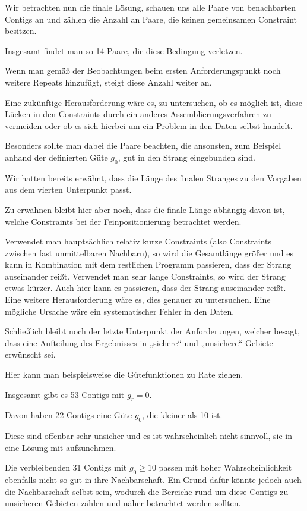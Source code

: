 Wir betrachten nun die finale Lösung, schauen uns alle Paare von benachbarten Contigs an und zählen die Anzahl an Paare, die keinen gemeinsamen Constraint besitzen.

Insgesamt findet man so 14 Paare, die diese Bedingung verletzen.

Wenn man gemäß der Beobachtungen beim ersten Anforderungspunkt noch weitere Repeats hinzufügt, steigt diese Anzahl weiter an.

Eine zukünftige Herausforderung wäre es, zu untersuchen, ob es möglich ist, diese Lücken in den Constraints durch ein anderes Assemblierungsverfahren zu vermeiden oder ob es sich hierbei um ein Problem in den Daten selbst handelt.

Besonders sollte man dabei die Paare beachten, die ansonsten, zum Beispiel anhand der definierten Güte $g_0$, gut in den Strang eingebunden sind.


Wir hatten bereits erwähnt, dass die Länge des finalen Stranges zu den Vorgaben aus dem vierten Unterpunkt passt.

Zu erwähnen bleibt hier aber noch, dass die finale Länge abhängig davon ist, welche Constraints bei der Feinpositionierung betrachtet werden.


Verwendet man hauptsächlich relativ kurze Constraints (also Constraints zwischen fast unmittelbaren Nachbarn), so wird die Gesamtlänge größer und es kann in Kombination mit dem restlichen Programm passieren, dass der Strang auseinander reißt. Verwendet man sehr lange Constraints, so wird der Strang etwas kürzer. Auch hier kann es passieren, dass der Strang auseinander reißt. Eine weitere Herausforderung wäre es, dies genauer zu untersuchen. Eine mögliche Ursache wäre ein systematischer Fehler in den Daten.

Schließlich bleibt noch der letzte Unterpunkt der Anforderungen, welcher besagt, dass eine Aufteilung des Ergebnisses in „sichere“ und „unsichere“ Gebiete erwünscht sei.

Hier kann man beispielsweise die Gütefunktionen zu Rate ziehen.


Insgesamt gibt es 53 Contigs mit $g_r = 0$.

Davon haben 22 Contigs eine Güte $g_0$, die kleiner als 10 ist.

Diese sind offenbar sehr unsicher und es ist wahrscheinlich nicht sinnvoll, sie in eine Lösung mit aufzunehmen. 

Die verbleibenden 31 Contigs mit $g_0 \geq 10$ passen mit hoher Wahrscheinlichkeit ebenfalls nicht so gut in ihre Nachbarschaft. Ein Grund dafür könnte jedoch auch die Nachbarschaft selbst sein, wodurch die Bereiche rund um diese Contigs zu unsicheren Gebieten zählen und näher betrachtet werden sollten.


